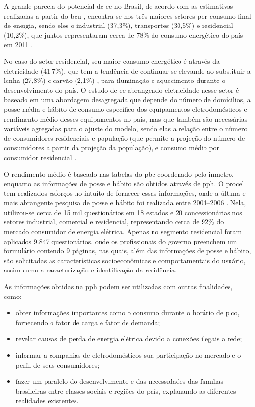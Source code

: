 A grande parcela do potencial de \gls{ee} no Brasil, de acordo com as
estimativas realizadas a partir do \gls{beu} \cite{beu}, encontra-se nos três
maiores setores por consumo final de energia, sendo eles o industrial (37,3\%), 
transportes (30,5\%) e residencial (10,2\%), que juntos representaram cerca 
de 78\% do consumo energético do país em 2011 \cite{ben2012,epe_eficiencia_2012}.

No caso do setor residencial, seu maior consumo energético é através da
eletricidade (41,7\%), que tem a tendência de continuar se elevando ao
substituir a lenha (27,8\%) e carvão (2,1\%) \cite{ben2012},
para iluminação e aquecimento durante o desenvolvimento do país. O estudo de 
\gls{ee} abrangendo eletricidade nesse setor é baseado em uma abordagem desagregada 
que depende do número de domícilios, a posse média e hábito de consumo específico 
dos equipamentos eletrodomésticos e rendimento médio desses equipamentos no país, 
mas que também são necessárias variáveis agregadas para o ajuste do modelo, 
sendo elas a relação entre o número de consumidores residenciais e população 
(que permite a projeção do número de consumidores a partir da projeção da população), 
e consumo médio por consumidor residencial \cite{epe_eficiencia_2012}. 

O rendimento médio é baseado nas tabelas do \gls{pbe} coordenado pelo \gls{inmetro}, 
enquanto as informações de posse e hábito são obtidos através de \gls{pph}. 
O \gls{procel} tem realizados esforços no intuíto de fornecer essas informações, 
onde a última e mais abrangente pesquisa de posse e hábito foi realizada entre 2004--2006 
\cite{result_procel_2005,site_pesquisas_procel}. Nela, utilizou-se cerca de 15 mil 
questionários em 18 estados e 20 concessionárias nos setores 
industrial, comercial e residencial, representando cerca de 92\% do 
mercado consumidor de energia elétrica. Apenas no segmento residencial foram
aplicados 9.847 questionários, onde os profissionais do governo preenchem um
formulário contendo 9 páginas, nas quais, além das informações de posse e
hábito, são solicitadas as características socioeconômicas e comportamentais do
usuário, assim como a caracterização e identificação da residência.

As informações obtidas na \gls{pph} podem ser utilizadas com outras finalidades,
como:

\begin{itemize}
\item obter informações importantes como o consumo durante o horário de pico,
fornecendo o fator de carga e fator de demanda;
\item revelar causas de perda de energia elétrica devido a conexões ilegais a
rede;
\item informar a companias de eletrodomésticos sua participação no mercado e 
o perfil de seus consumidores;
\item fazer um paralelo do desenvolvimento e das necessidades das familias 
brasileiras entre classes sociais e regiões do país, explanando as 
diferentes realidades existentes.
\end{itemize}

